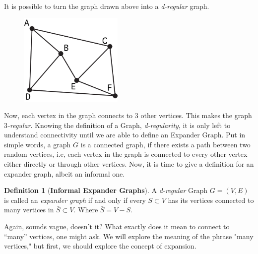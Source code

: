 \documentclass{article}
\theoremstyle{theorem}
\theoremstyle{definition}
\newtheorem{definition}{Definition}[section]
\theoremstyle{example}
\theoremstyle{proposition}
\begin{document}
        It is possible to turn the graph drawn above into a \textit{d-regular} graph.
            \begin{figure}[h]
                \includegraphics[width=5cm]{dGraph.png}
                \centering
            \end{figure}
        Now, each vertex in the graph connects to $3$ other vertices. This makes the graph \textit{$3$-regular}.
        Knowing the definition of a Graph, \textit{d-regularity}, it is only left to understand connectivity until we are able to define an Expander Graph. Put in simple words, a graph $G$ is a connected graph, if there exists a path between two random vertices, i.e, each vertex in the graph is connected to every other vertex either directly or through other vertices.
        Now, it is time to give a definition for an expander graph, albeit an informal one.
        \begin{definition}[\textbf{Informal Expander Graphs}]
            A \textit{d-regular} Graph $G = (V,E)$ is called an \textit{expander graph} if and only if every $S \subset V$ has its vertices connected to many vertices in $\bar{S} \subset V$. Where $\bar{S} = V - S$.
        \end{definition}
        Again, sounds vague, doesn't it? What exactly does it mean to connect to ``many'' vertices, one might ask. We will explore the meaning of the phrase "many vertices," but first, we should explore the concept of expansion.
\end{document}
